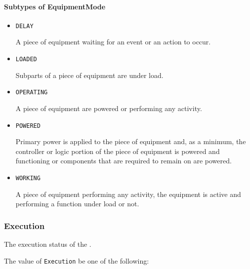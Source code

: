 \FloatBarrier

\paragraph{Subtypes of EquipmentMode}\mbox{}
\label{sec:Subtypes of EquipmentMode}

\begin{itemize}

\item \texttt{DELAY}


A piece of equipment waiting for an event or an action to occur.

\item \texttt{LOADED}


Subparts of a piece of equipment are under load.

\item \texttt{OPERATING}


A piece of equipment are powered or performing any activity.

\item \texttt{POWERED}


Primary  power is  applied  to the  piece  of  equipment and,  as  a minimum, the controller or logic portion of the piece of equipment is powered and functioning or components that are required to remain on are powered.

\item \texttt{WORKING}


A piece of equipment performing any activity, the equipment is active and performing a function under load or not.


\end{itemize}

\subsubsection{Execution}
\label{sec:Execution}



The execution status of the .


The value of \texttt{Execution} \MUST be one of the following: 


